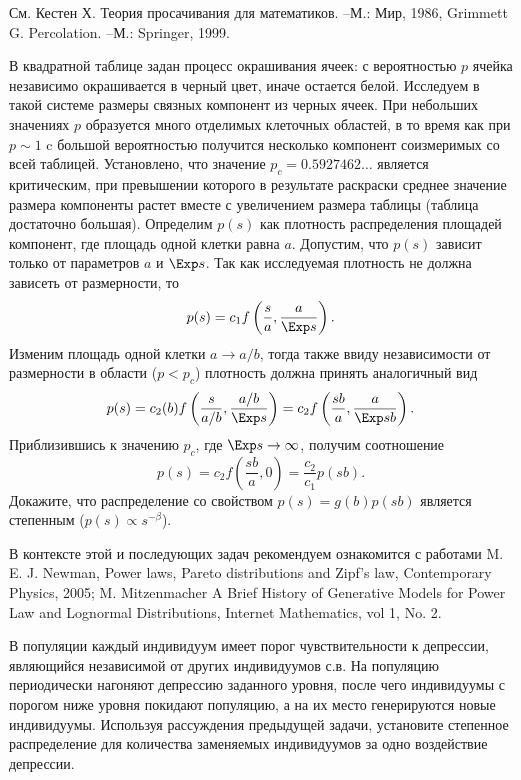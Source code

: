 \begin{remark} 
См. Кестен Х. Теория просачивания для математиков. --М.: Мир, 1986, Grimmett G. Percolation. --М.:  Springer, 1999.
\end{remark}



\begin{problem}
В квадратной таблице задан процесс окрашивания ячеек: с вероятностью $p$ ячейка независимо окрашивается в черный цвет, иначе остается белой. Исследуем в такой системе размеры связных компонент из черных ячеек. При небольших значениях $p$ образуется много отделимых клеточных областей, в то время как при $p \sim 1$ c большой вероятностью получится несколько  компонент соизмеримых со всей таблицей. Установлено, что значение $p_c = 0.5927462\ldots$ является критическим, при превышении которого в результате раскраски  среднее значение размера компоненты растет вместе с увеличением размера таблицы (таблица достаточно большая). Определим $p(s)$ как плотность распределения площадей компонент, где площадь одной клетки равна $a$. Допустим, что $p(s)$ зависит только от параметров $a$ и $\Exp s$. Так как исследуемая плотность не должна зависеть от размерности, то 
\[
p(s) = c_1 f\left( \frac{s}{a}, \frac{a}{\Exp s} \right).
\]      
Изменим площадь одной клетки $a \to a/b$, тогда также ввиду независимости от размерности в области ($p < p_c$) плотность должна принять аналогичный вид  
\[
p(s) = c_2(b) f\left( \frac{s}{a/b}, \frac{a/b}{\Exp s} \right) = c_2 f\left( \frac{sb}{a}, \frac{a}{\Exp sb} \right) .
\]
Приблизившись к значению $p_c$, где $\Exp s \to \infty$, получим соотношение
\[
p(s) = c_2 f\left( \frac{sb}{a}, 0 \right) = \frac{c_2}{c_1} p(sb).
\]
Докажите, что распределение со свойством $p(s) = g(b) p(sb)$  является степенным ($p(s) \propto s^{-\beta}$).
\end{problem}

\begin{remark}
В контексте этой и последующих задач рекомендуем ознакомится с работами M. E. J. Newman, Power laws, Pareto distributions and Zipf’s law, Contemporary Physics, 2005; M. Mitzenmacher
A Brief History of Generative Models for Power Law and Lognormal Distributions, Internet Mathematics, vol 1, No. 2. 
\end{remark}

\begin{problem}
В популяции каждый индивидуум имеет  порог чувствительности к депрессии, являющийся независимой от других индивидуумов с.в. 
На популяцию периодически нагоняют депрессию заданного уровня, после чего индивидуумы с порогом ниже уровня покидают популяцию, а на их место генерируются новые индивидуумы. Используя рассуждения предыдущей задачи, установите степенное распределение для количества заменяемых индивидуумов за одно воздействие депрессии.     
\end{problem}

